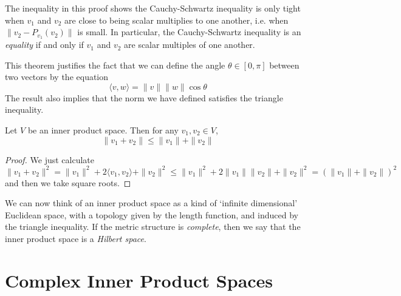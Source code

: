 \begin{remark}
    The inequality in this proof shows the Cauchy-Schwartz inequality is only tight when $v_1$ and $v_2$ are close to being scalar multiplies to one another, i.e. when $\| v_2 - P_{v_1}(v_2) \|$ is small. In particular, the Cauchy-Schwartz inequality is an \emph{equality} if and only if $v_1$ and $v_2$ are scalar multiples of one another.
\end{remark}

This theorem justifies the fact that we can define the angle $\theta \in [0,\pi]$ between two vectors by the equation
%
\[ \langle v, w \rangle = \|v\| \|w\| \cos \theta \]
%
The result also implies that the norm we have defined satisfies the triangle inequality.

\begin{theorem}
    Let $V$ be an inner product space. Then for any $v_1,v_2 \in V$,
    \[ \| v_1 + v_2 \| \leq \| v_1 \| + \| v_2 \| \]
\end{theorem}
\begin{proof}
    We just calculate
    \[ \| v_1 + v_2 \|^2 = \| v_1 \|^2 + 2 \langle v_1, v_2 \rangle + \| v_2 \|^2 \leq \| v_1 \|^2 + 2 \|v_1\| \|v_2\| + \|v_2\|^2 = \left(\|v_1 \| + \|v_2\| \right)^2 \]
    and then we take square roots.
\end{proof}

We can now think of an inner product space as a kind of `infinite dimensional' Euclidean space, with a topology given by the length function, and induced by the triangle inequality. If the metric structure is {\it complete}, then we say that the inner product space is a \emph{Hilbert space}.

\section{Complex Inner Product Spaces}

